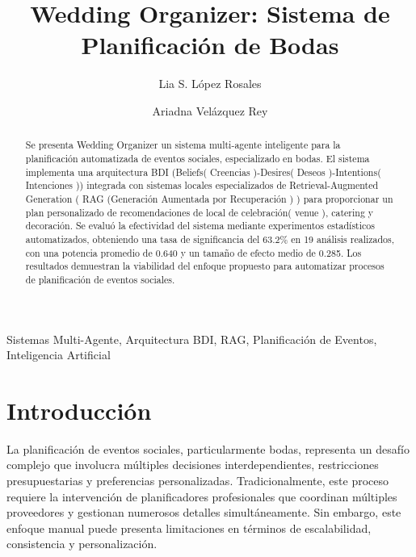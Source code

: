 \documentclass[runningheads,a4paper]{llncs}
\newcommand{\keywords}[1]{\par\addvspace\baselineskip
\noindent\keywordname\enspace\ignorespaces#1}
\begin{document}
\mainmatter

\title{Wedding Organizer: Sistema de Planificación de Bodas}


\author{Lia S. López Rosales\and Ariadna Velázquez Rey}


\maketitle

\begin{abstract}
Se presenta Wedding Organizer un sistema multi-agente inteligente para la planificación automatizada de eventos sociales, especializado en bodas. El sistema implementa una arquitectura BDI (Beliefs( Creencias )-Desires( Deseos )-Intentions( Intenciones )) integrada con sistemas locales especializados de Retrieval-Augmented Generation ( RAG (Generación Aumentada por Recuperación ) ) para proporcionar un plan personalizado de recomendaciones de local de celebración( venue ), catering y decoración. Se evaluó la efectividad del sistema mediante experimentos estadísticos automatizados, obteniendo una tasa de significancia del 63.2\% en 19 análisis realizados, con una potencia promedio de 0.640 y un tamaño de efecto medio de 0.285. Los resultados demuestran la viabilidad del enfoque propuesto para automatizar procesos de planificación de eventos sociales.
\end{abstract}

\keywords{Sistemas Multi-Agente, Arquitectura BDI, RAG, Planificación de Eventos, Inteligencia Artificial}

\section{Introducción}

La planificación de eventos sociales, particularmente bodas, representa un desafío complejo que involucra múltiples decisiones interdependientes, restricciones presupuestarias y preferencias personalizadas. Tradicionalmente, este proceso requiere la intervención de planificadores profesionales que coordinan múltiples proveedores y gestionan numerosos detalles simultáneamente. Sin embargo, este enfoque manual puede presenta limitaciones en términos de escalabilidad, consistencia y personalización.
\end{document}
